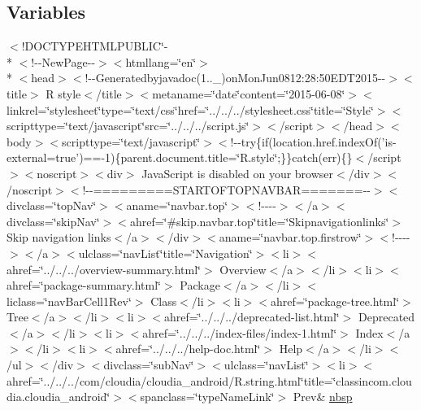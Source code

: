 \subsection*{Variables}
\begin{DoxyCompactItemize}
\item 
$<$!D\-O\-C\-T\-Y\-P\-E\-H\-T\-M\-L\-P\-U\-B\-L\-I\-C\char`\"{}-\/\\*
$<$!-\/-\/New\-Page-\/-\/$>$$<$htmllang=\char`\"{}en\char`\"{}$>$\\*
$<$head$>$$<$!-\/-\/Generatedbyjavadoc(1..\-\_)on\-Mon\-Jun0812\-:28\-:50\-E\-D\-T2015-\/-\/$>$$<$title$>$ R style$<$/title$>$$<$metaname=\char`\"{}date\char`\"{}content=\char`\"{}2015-\/06-\/08\char`\"{}$>$$<$linkrel=\char`\"{}stylesheet\char`\"{}type=\char`\"{}text/css\char`\"{}href=\char`\"{}../../../stylesheet.\-css\char`\"{}title=\char`\"{}\-Style\char`\"{}$>$$<$scripttype=\char`\"{}text/javascript\char`\"{}src=\char`\"{}../../../script.\-js\char`\"{}$>$$<$/script$>$$<$/head$>$$<$body$>$$<$scripttype=\char`\"{}text/javascript\char`\"{}$>$$<$!-\/-\/try\{if(location.\-href.\-index\-Of('is-\/external=true')==-\/1)\{parent.\-document.\-title=\char`\"{}\-R.\-style\char`\"{};\}\}catch(err)\{\}$<$/script$>$$<$noscript$>$$<$div$>$ Java\-Script is disabled on your browser$<$/div$>$$<$/noscript$>$$<$!-\/-\/=========\-S\-T\-A\-R\-T\-O\-F\-T\-O\-P\-N\-A\-V\-B\-A\-R=======-\/-\/$>$$<$divclass=\char`\"{}top\-Nav\char`\"{}$>$$<$aname=\char`\"{}navbar.\-top\char`\"{}$>$$<$!-\/-\/-\/-\/$>$$<$/a$>$$<$divclass=\char`\"{}skip\-Nav\char`\"{}$>$$<$ahref=\char`\"{}\#skip.\-navbar.\-top\char`\"{}title=\char`\"{}\-Skipnavigationlinks\char`\"{}$>$ Skip navigation links$<$/a$>$$<$/div$>$$<$aname=\char`\"{}navbar.\-top.\-firstrow\char`\"{}$>$$<$!-\/-\/-\/-\/$>$$<$/a$>$$<$ulclass=\char`\"{}nav\-List\char`\"{}title=\char`\"{}\-Navigation\char`\"{}$>$$<$li$>$$<$ahref=\char`\"{}../../../overview-\/summary.\-html\char`\"{}$>$ Overview$<$/a$>$$<$/li$>$$<$li$>$$<$ahref=\char`\"{}package-\/summary.\-html\char`\"{}$>$ Package$<$/a$>$$<$/li$>$$<$liclass=\char`\"{}nav\-Bar\-Cell1\-Rev\char`\"{}$>$ Class$<$/li$>$$<$li$>$$<$ahref=\char`\"{}package-\/tree.\-html\char`\"{}$>$ Tree$<$/a$>$$<$/li$>$$<$li$>$$<$ahref=\char`\"{}../../../deprecated-\/list.\-html\char`\"{}$>$ Deprecated$<$/a$>$$<$/li$>$$<$li$>$$<$ahref=\char`\"{}../../../index-\/files/index-\/1.\-html\char`\"{}$>$ Index$<$/a$>$$<$/li$>$$<$li$>$$<$ahref=\char`\"{}../../../help-\/doc.\-html\char`\"{}$>$ Help$<$/a$>$$<$/li$>$$<$/ul$>$$<$/div$>$$<$divclass=\char`\"{}sub\-Nav\char`\"{}$>$$<$ulclass=\char`\"{}nav\-List\char`\"{}$>$$<$li$>$$<$ahref=\char`\"{}../../../com/cloudia/cloudia\-\_\-android/\-R.\-string.\-html\char`\"{}title=\char`\"{}classincom.\-cloudia.\-cloudia\-\_\-android\char`\"{}$>$$<$spanclass=\char`\"{}type\-Name\-Link\char`\"{}$>$ Prev\& \hyperlink{_r_8style_8html_aef915316f784c9063d942974538301a6}{nbsp}

\end{DoxyCompactItemize}
